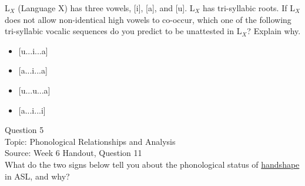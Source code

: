 \documentclass[12pt]{article}
\begin{document}
L$_X$ (Language X) has three vowels, [i], [a], and [u]. L$_X$ has tri-syllabic roots. If L$_X$ does not allow non-identical high vowels to co-occur, which one of the following tri-syllabic vocalic sequences do you predict to be unattested in L$_X$? Explain why.\\

\begin{itemize} \item {[u...i...a]} \item {[a...i...a]} \item {[u...u...a]} \item {[a...i...i]} \end{itemize}


\newpage

{\large Question 5}\\

Topic: Phonological Relationships and Analysis\\
Source: Week 6 Handout, Question 11\\

What do the two signs below tell you about the phonological status of \underline{handshape} in ASL, and why?\\
\end{document}
